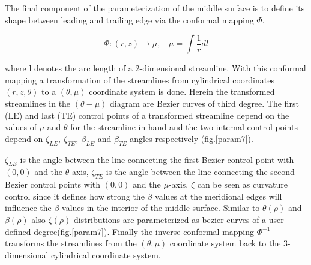 The final component of the parameterization of the middle surface is to define its shape between leading and trailing edge via the conformal mapping $\Phi$.


\begin{equation} 
   \Phi:(r,z)\rightarrow \mu, ~~~~\mu=\int{\frac{1}{r}dl}
   \label{phi1} 
\end{equation}

where l denotes the arc length of a 2-dimensional streamline. With this conformal mapping a transformation of the streamlines from cylindrical coordinates $(r,z,\theta)$ to a $(\theta,\mu)$ coordinate system is done. Herein the transformed streamlines in the $(\theta-\mu)$ diagram are Bezier curves of third degree. The first (LE) and last (TE) control points of a transformed streamline depend on the values of $\mu$ and $\theta$ for the streamline in hand and the two internal control points depend on $\zeta_{LE}, ~\zeta_{TE}, ~\beta_{LE}$ and $\beta_{TE}$ angles respectively (fig.\ref{param7}).
  
$\zeta_{LE}$ is the angle between the line connecting the first Bezier control point with $(0,0)$ and the $\theta$-axis, $\zeta_{TE}$  is the angle between the line connecting the second Bezier control points with $(0,0)$ and the $\mu$-axis. $\zeta$ can be seen as curvature control since it defines how strong the $\beta$ values at the meridional edges will influence the $\beta$ values in the interior of the middle surface. Similar to $\theta(\rho)$ and $\beta(\rho)$ also $\zeta(\rho)$ distributions are parameterized as bezier curves of a user defined degree(fig.\ref{param7}). Finally the inverse conformal mapping $\Phi^{-1}$ transforms the streamlines from the $(\theta,\mu)$ coordinate system back to the 3-dimensional cylindrical coordinate system. 

